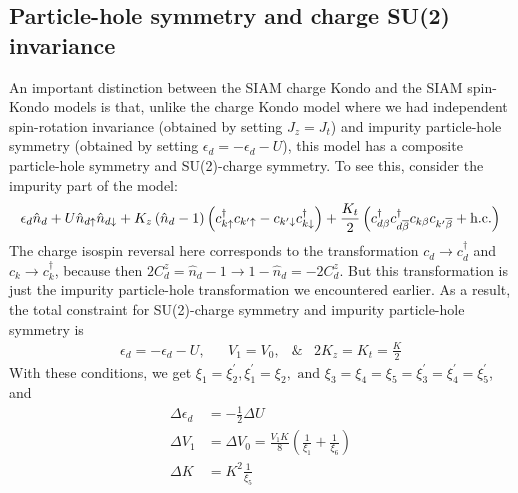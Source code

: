 \documentclass[12pt,twoside]{article}
\numberwithin{equation}{section}
\begin{document}
\subsection{Particle-hole symmetry and charge SU(2) invariance}
An important distinction between the SIAM charge Kondo and the SIAM spin-Kondo models is that, unlike the charge Kondo model where we had independent spin-rotation invariance (obtained by setting \(J_z = J_t\)) and impurity particle-hole symmetry (obtained by setting \(\epsilon_d = -\epsilon_d - U\)), this model has a composite particle-hole symmetry and SU(2)-charge symmetry. To see this, consider the impurity part of the model:
\begin{equation}
	\epsilon_d \hat n_d + U \hat n_{d\uparrow}\hat n_{d\downarrow} + K_z \left(\hat n_d - 1\right)\left(c^\dagger_{k\uparrow}c_{k^\prime\uparrow} - c_{k^\prime\downarrow}c^\dagger_{k\downarrow}\right) + \frac{K_t}{2}\left(c^\dagger_{d\beta}c^\dagger_{d\overline\beta}c_{k\beta}c_{k^\prime\overline\beta} + \text{h.c.}\right)
\end{equation}
The charge isospin reversal here corresponds to the transformation \(c_d \to c^\dagger_d\) and \(c_k \to c^\dagger_k\), because then \(2C^z_d = \hat n_d - 1 \to 1 - \hat n_d = -2C^z_d\). But this transformation is just the impurity particle-hole transformation we encountered earlier. As a result, the total constraint for SU(2)-charge symmetry and impurity particle-hole symmetry is
\begin{equation}\begin{aligned}
	\label{symm-charge}
	\epsilon_d = -\epsilon_d - U, && V_1 = V_0, &\& & 2K_z = K_t = \frac{K}{2} 
\end{aligned}\end{equation}
With these conditions, we get \(\xi_1 = \xi_2^\prime, \xi_1^\prime = \xi_2, \text{ and }\xi_3 = \xi_4 = \xi_5 = \xi_3^\prime = \xi_4^\prime = \xi_5^\prime\), and
\begin{equation}\begin{aligned}
	\Delta \epsilon_d &= -\frac{1}{2}\Delta U\\
	\Delta V_1 &= \Delta V_0 = \frac{V_1 K}{8}\left( \frac{1}{\xi_1} + \frac{1}{\xi_6} \right)\\
	\Delta K &= K^2 \frac{1}{\xi_5}
\end{aligned}\end{equation}
\end{document}
